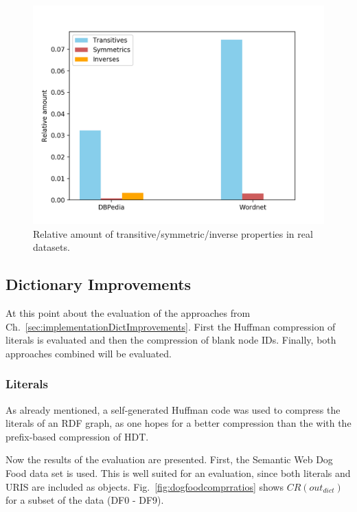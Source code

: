 \begin{figure}
	\centering
	\includegraphics[width=0.7\linewidth]{figures/4_evaluation/ontOccurrences}
	\caption{Relative amount of transitive/symmetric/inverse properties in real datasets.}
	\label{fig:ontoccurrences}
\end{figure}




\subsection{Dictionary Improvements}\label{sec:evaluationDictImprovements}

At this point  about the evaluation of the approaches from Ch.~\ref{sec:implementationDictImprovements}. First the Huffman compression of literals is evaluated and then the compression of blank node IDs. Finally, both approaches combined will be evaluated.


\subsubsection{Literals}

As already mentioned, a self-generated Huffman code was used to compress the literals of an RDF graph, as one hopes for a better compression than the with the prefix-based compression of HDT.

Now the results of the evaluation are presented. First, the Semantic Web Dog Food data set is used. This is well suited for an evaluation, since both literals and URIS are included as objects. Fig.~\ref{fig:dogfoodcomprratios} shows $CR(out_{dict})$ for a subset of the data (DF0 - DF9). 


